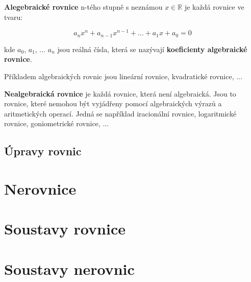 \documentclass[11pt]{article}
\begin{document}
{\bf Alegebraické rovnice} n-tého stupně s neznámou $x \in \mathbb{R}$ je každá rovnice ve tvaru:

$$ a_nx^n + a_{n-1}x^{n-1} + ... + a_1x + a_0 = 0 $$

kde $a_0$, $a_1$, ... $a_n$ jsou reálná čísla, která se nazývají {\bf koeficienty algebraické rovnice}.

Příkladem algebraických rovnic jsou lineární rovnice, kvadratické rovnice, ...

{\bf Nealgebraická rovnice} je každá rovnice, která není algebraická. Jsou to rovnice, které nemohou být vyjádřeny pomocí algebraických výrazů a aritmetických operací. Jedná se například iracionální rovnice, logaritmické rovnice, goniometrické rovnice, ... 

\subsection{Úpravy rovnic}


\section{Nerovnice}


\section{Soustavy rovnice}



\section{Soustavy nerovnic}
\end{document}
